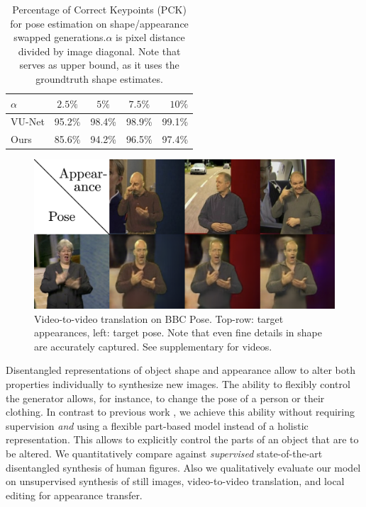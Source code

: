 \begin{table}
	\caption{Percentage of Correct Keypoints (PCK) for pose estimation on shape/appearance swapped generations.\;$\alpha$ is pixel distance divided by image diagonal. Note that \cite{esser18} serves as upper bound, as it uses the groundtruth shape estimates.}
	\label{tab:pose}
	\begin{tabular}{l|cccr}
		\hline
		$\alpha$ & $2.5\%$ &  $5\%$ & $7.5\%$ & $10\%$ \\ \hline
		VU-Net \cite{esser18} & {95.2}\% & {98.4}\% & {98.9}\% & {99.1}\% \\
		Ours & 85.6\% & 94.2\% &96.5\% & 97.4\% \\ \hline
	\end{tabular}
\end{table}
%
\begin{figure}[t]
	\centering
	\includegraphics[trim={0cm 0cm 0cm 0cm},clip, width=1.\linewidth]{fig/bbcthumb}
	\caption{Video-to-video translation on BBC Pose. Top-row: target appearances, left: target pose.
	Note that even fine details in shape are accurately captured. See supplementary for videos.}
	\label{fig:bbcthumb}
\end{figure}

	Disentangled representations of object shape and appearance allow to alter both properties individually to synthesize new images. The ability to flexibly control the generator allows, for instance, to change the pose of a person or their clothing. In contrast to previous work \cite{esser18, denton17disvideo, ma17poseguided, ma17disperson, debem18dgpose, jakab18},
	we achieve this ability without requiring supervision \textit{and} using a flexible part-based model instead of a holistic representation. This allows to explicitly control the parts of an object that are to be altered. We quantitatively compare against \emph{supervised} state-of-the-art disentangled synthesis of human figures. Also we qualitatively evaluate our model on unsupervised synthesis of still images, video-to-video translation, and local editing for appearance transfer.


